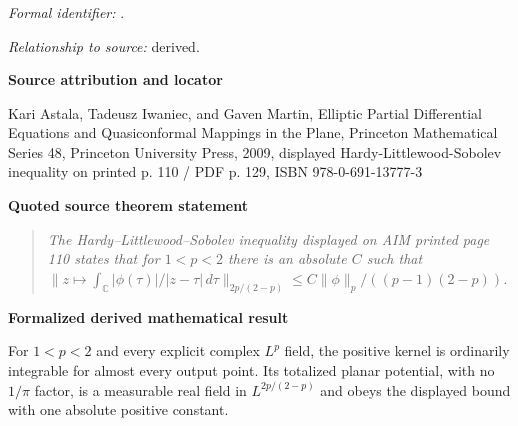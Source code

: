 \documentclass[10pt,oneside]{article}
\newenvironment{sourcequote}{\begin{quote}\itshape}{\end{quote}}
\newcommand{\reviewlabel}[1]{\par\smallskip\noindent\textsf{\bfseries #1}\par\smallskip}
\begin{document}
\subsubsection{\texttt{}}
\noindent\textit{Formal identifier:} \texttt{}.\par
\noindent\textit{Relationship to source:} derived.

\reviewlabel{Source attribution and locator}
Kari Astala, Tadeusz Iwaniec, and Gaven Martin, Elliptic Partial Differential Equations and Quasiconformal Mappings in the Plane, Princeton Mathematical Series 48, Princeton University Press, 2009, displayed Hardy-Littlewood-Sobolev inequality on printed p. 110 / PDF p. 129, ISBN 978-0-691-13777-3

\reviewlabel{Quoted source theorem statement}
\begin{sourcequote}
The Hardy--Littlewood--Sobolev inequality displayed on AIM printed page 110 states that for $1<p<2$ there is an absolute $C$ such that $\|z\mapsto\int_{\mathbb C}|\phi(\tau)|/|z-\tau|\,d\tau\|_{2p/(2-p)}\leq C\|\phi\|_p/((p-1)(2-p))$.
\end{sourcequote}

\reviewlabel{Formalized derived mathematical result}
For $1<p<2$ and every explicit complex $L^p$ field, the positive kernel is ordinarily integrable for almost every output point. Its totalized planar potential, with no $1/\pi$ factor, is a measurable real field in $L^{2p/(2-p)}$ and obeys the displayed bound with one absolute positive constant.
\end{document}
